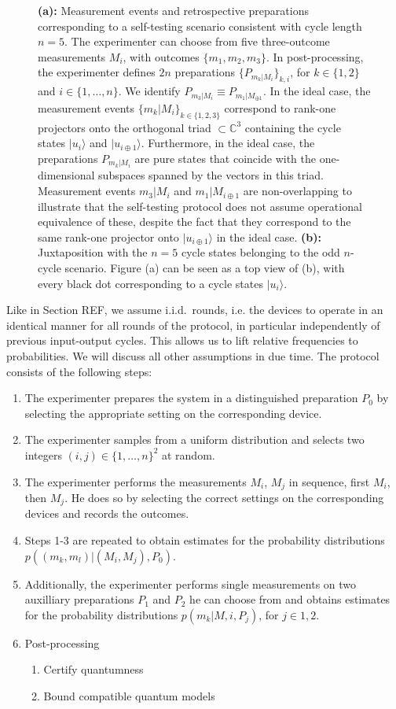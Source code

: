 \begin{figure}
    \caption{\textbf{(a):} Measurement events and retrospective preparations corresponding to a self-testing scenario consistent with cycle length $n=5$. The experimenter can choose from five three-outcome measurements $M_i$, with outcomes $\{m_1,m_2,m_3\}$. In post-processing, the experimenter defines $2n$ preparations $\{P_{m_k\vert M_i}\}_{k,i}$, for $k\in\{1,2\}$ and $i\in\{1,\dots,n\}$. We identify $P_{m_3\vert M_i}\equiv P_{m_1\vert M_{\oplus 1}}$. In the ideal case, the measurement events $\{m_k\vert M_i\}_{k\in\{1,2,3\}}$ correspond to rank-one projectors onto the orthogonal triad $\subset \mathbb{C}^3$ containing the cycle states $\vert u_i\rangle$ and $\vert u_{i\oplus 1}\rangle$. Furthermore, in the ideal case, the preparations $P_{m_k\vert M_i}$ are pure states that coincide with the one-dimensional subspaces spanned by the vectors in this triad. Measurement events $m_3\vert M_i$ and $m_1\vert M_{i\oplus 1}$ are non-overlapping to illustrate that the self-testing protocol does not assume operational equivalence of these, despite the fact that they correspond to the same rank-one projector onto $\vert u_{i\oplus 1}\rangle$ in the ideal case. \textbf{(b):} Juxtaposition with the $n=5$ cycle states belonging to the odd $n$-cycle scenario. Figure (a) can be seen as a top view of (b), with every black dot corresponding to a cycle states $\vert u_i\rangle$.}
\end{figure}

Like in Section REF, we assume i.i.d.\ rounds, i.e. the devices to operate in an identical manner for all rounds of the protocol, in particular independently of previous input-output cycles. This allows us to lift relative frequencies to probabilities. We will discuss all other assumptions in due time. The protocol consists of the following steps:
\begin{enumerate}
\item The experimenter prepares the system in a distinguished preparation $P_0$ by selecting the appropriate setting on the corresponding device.
\item The experimenter samples from a uniform distribution and selects two integers $(i,j)\in\{1,\dots,n\}^2$ at random.
\item The experimenter performs the measurements $M_i$, $M_j$ in sequence, first $M_i$, then $M_j$. He does so by selecting the correct settings on the corresponding devices and records the outcomes.
\item Steps 1-3 are repeated to obtain estimates for the probability distributions $p((m_k,m_l)\vert (M_i,M_j),P_0)$. 
\item Additionally, the experimenter performs single measurements on two auxilliary preparations $P_1$ and $P_2$ he can choose from and obtains estimates for the probability distributions $p(m_k\vert M,i, P_j)$, for $j\in{1,2}$.
\item Post-processing
	\begin{enumerate}
	\item Certify quantumness
	\item Bound compatible quantum models
	\end{enumerate}
\end{enumerate}

